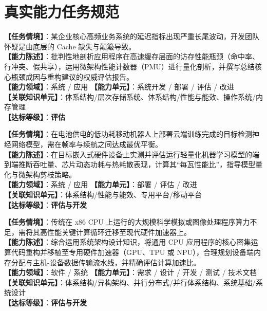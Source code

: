 \section{真实能力任务规范}

\begin{taskbox}[任务 1：应用程序中的高速缓存性能瓶颈评估与优化]
\textbf{【任务情境】}：某企业核心高频业务系统的延迟指标出现严重长尾波动，开发团队怀疑是由底层的 Cache 缺失与颠簸导致。\\
\textbf{【能力陈述】}：批判性地剖析应用程序在高速缓存层面的访存性能瓶颈（命中率、行冲突、假共享），运用微架构性能计数器（PMU）进行量化剖析，并撰写总结核心瓶颈成因与重构建议的权威评估报告。\\
\textbf{【能力领域】}：系统 / 应用 \quad \textbf{【能力单元】}：系统开发 / 部署 / 评估 / 改进\\
\textbf{【关联知识单元】}：体系结构/层次存储系统、体系结构/性能与能效、操作系统/内存管理\\
\textbf{【达标等级】}：\textbf{评估}
\end{taskbox}

\begin{taskbox}
\textbf{【任务情境】}：在电池供电的低功耗移动机器人上部署云端训练完成的目标检测神经网络模型，需在帧率与续航之间达成最优平衡。\\
\textbf{【能力陈述】}：在目标嵌入式硬件设备上实测并评估运行轻量化机器学习模型的端到端推断吞吐量、芯片动态功耗与热耗散表现，计算其“每瓦性能比”，指导模型量化与微架构剪枝策略。\\
\textbf{【能力领域】}：系统 / 应用 \quad \textbf{【能力单元】}：部署 / 评估 / 改进\\
\textbf{【关联知识单元】}：体系结构/性能与能效、专用平台/移动平台\\
\textbf{【达标等级】}：\textbf{评估与开发}
\end{taskbox}

\begin{taskbox}
\textbf{【任务情境】}：传统在 x86 CPU 上运行的大规模科学模拟或图像处理程序算力不足，需将其高性能关键计算循环迁移至现代硬件加速器上。\\
\textbf{【能力陈述】}：综合运用系统架构设计知识，将通用 CPU 应用程序的核心密集运算代码重构并移植至专用硬件加速器（GPU、TPU 或 NPU），合理规划设备端内存分配与主机-设备数据传输流水线，并精确评估计算加速比。\\
\textbf{【能力领域】}：软件 / 系统 \quad \textbf{【能力单元】}：需求 / 设计 / 开发 / 测试 / 技术文档\\
\textbf{【关联知识单元】}：体系结构/异构架构、并行分布式/并行体系结构、系统基础/系统设计\\
\textbf{【达标等级】}：\textbf{评估与开发}
\end{taskbox}

